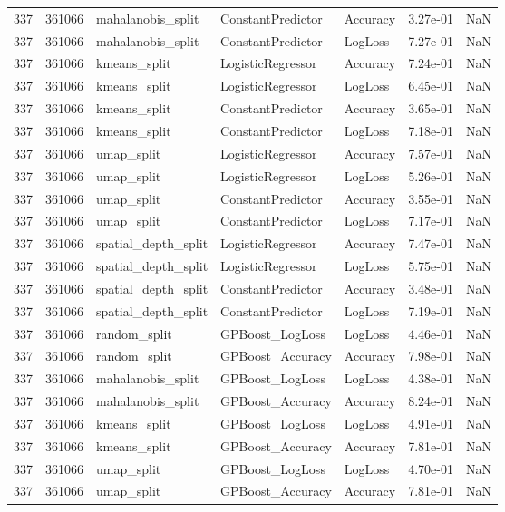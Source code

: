 \begin{tabular}{rrlllrr}
337 & 361066 & mahalanobis\_split & ConstantPredictor & Accuracy & 3.27e-01 & NaN \\
337 & 361066 & mahalanobis\_split & ConstantPredictor & LogLoss & 7.27e-01 & NaN \\
337 & 361066 & kmeans\_split & LogisticRegressor & Accuracy & 7.24e-01 & NaN \\
337 & 361066 & kmeans\_split & LogisticRegressor & LogLoss & 6.45e-01 & NaN \\
337 & 361066 & kmeans\_split & ConstantPredictor & Accuracy & 3.65e-01 & NaN \\
337 & 361066 & kmeans\_split & ConstantPredictor & LogLoss & 7.18e-01 & NaN \\
337 & 361066 & umap\_split & LogisticRegressor & Accuracy & 7.57e-01 & NaN \\
337 & 361066 & umap\_split & LogisticRegressor & LogLoss & 5.26e-01 & NaN \\
337 & 361066 & umap\_split & ConstantPredictor & Accuracy & 3.55e-01 & NaN \\
337 & 361066 & umap\_split & ConstantPredictor & LogLoss & 7.17e-01 & NaN \\
337 & 361066 & spatial\_depth\_split & LogisticRegressor & Accuracy & 7.47e-01 & NaN \\
337 & 361066 & spatial\_depth\_split & LogisticRegressor & LogLoss & 5.75e-01 & NaN \\
337 & 361066 & spatial\_depth\_split & ConstantPredictor & Accuracy & 3.48e-01 & NaN \\
337 & 361066 & spatial\_depth\_split & ConstantPredictor & LogLoss & 7.19e-01 & NaN \\
337 & 361066 & random\_split & GPBoost\_LogLoss & LogLoss & 4.46e-01 & NaN \\
337 & 361066 & random\_split & GPBoost\_Accuracy & Accuracy & 7.98e-01 & NaN \\
337 & 361066 & mahalanobis\_split & GPBoost\_LogLoss & LogLoss & 4.38e-01 & NaN \\
337 & 361066 & mahalanobis\_split & GPBoost\_Accuracy & Accuracy & 8.24e-01 & NaN \\
337 & 361066 & kmeans\_split & GPBoost\_LogLoss & LogLoss & 4.91e-01 & NaN \\
337 & 361066 & kmeans\_split & GPBoost\_Accuracy & Accuracy & 7.81e-01 & NaN \\
337 & 361066 & umap\_split & GPBoost\_LogLoss & LogLoss & 4.70e-01 & NaN \\
337 & 361066 & umap\_split & GPBoost\_Accuracy & Accuracy & 7.81e-01 & NaN \\

\end{tabular}

